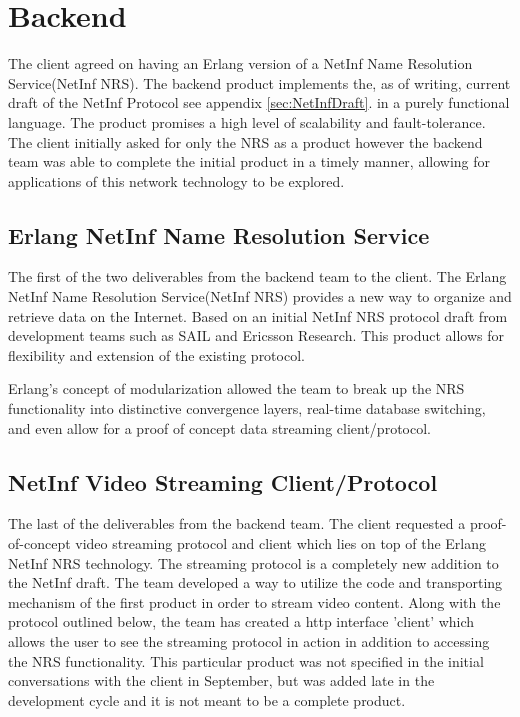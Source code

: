\section {Backend}

The client agreed on having an Erlang version of a NetInf Name Resolution Service(NetInf NRS). The backend product implements the, as of writing, current draft of the NetInf Protocol see appendix  \ref{sec:NetInfDraft}.  in a purely functional language. The product promises a high level of scalability and fault-tolerance. The client initially asked for only the NRS as a product however the backend team was able to complete the initial product in a timely manner, allowing for applications of this network technology to be explored. 


\subsection {Erlang NetInf Name Resolution Service}
The first of the two deliverables from the backend team to the client. The Erlang NetInf Name Resolution Service(NetInf NRS) provides a new way to organize and retrieve data on the Internet. Based on an initial NetInf NRS protocol draft from development teams such as SAIL and Ericsson Research. This product allows for flexibility and extension of the existing protocol.

Erlang's concept of modularization allowed the team to break up the NRS functionality into distinctive convergence layers, real-time database switching, and even allow for a proof of concept data streaming client/protocol. 

\subsection{NetInf Video Streaming Client/Protocol}

The last of the deliverables from the backend team. The client requested a proof-of-concept video streaming protocol and client which lies on top of the Erlang NetInf NRS technology. The streaming protocol is a completely new addition to the NetInf draft. The team developed a way to utilize the code and transporting mechanism of the first product in order to stream video content. Along with the protocol outlined below, the team has created a http interface 'client' which allows the user to see the streaming protocol in action in addition to accessing the NRS functionality. This particular product was not specified in the initial conversations with the client in September, but was added late in the development cycle and it is not meant to be a complete product.

